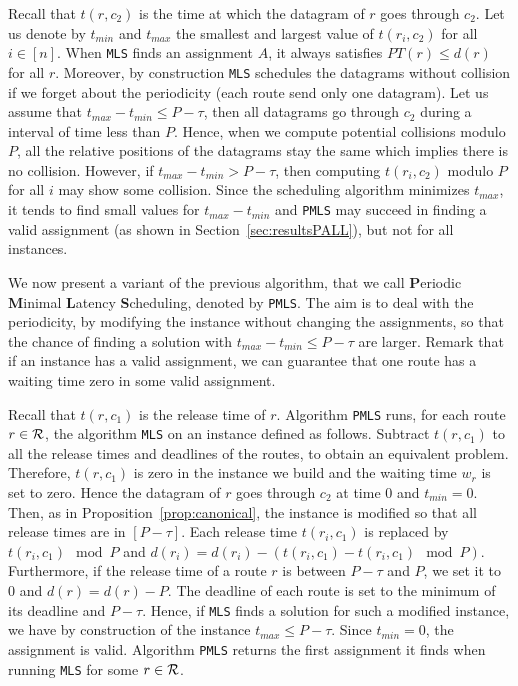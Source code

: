 \documentclass[a4paper,10pt]{journal}
\newcommand\MLS{\texttt{MLS}\xspace}
\newcommand\PMLS{\texttt{PMLS}\xspace}
\begin{document}
    
     Recall that $t(r,c_2)$ is the time at which the datagram of $r$ goes through $c_2$. Let us denote by $t_{min}$ and $t_{max}$ the smallest and largest value of $t(r_i,c_2)$ for all $i \in[n]$. When \MLS finds an assignment $A$, it always satisfies $PT(r) \leq d(r)$ for all $r$. Moreover, by construction \MLS schedules the datagrams without collision if we forget about the periodicity (each route send only one datagram). Let us assume that $t_{max}- t_{min} \leq P -\tau $, then all datagrams go through $c_2$ during a interval of time less than $P$. Hence, when we compute potential collisions modulo $P$, all the relative positions of the datagrams stay the same which implies there is no collision. However, if $t_{max}- t_{min} > P -\tau $, then computing $t(r_i,c_2)$ modulo $P$ for all $i$ may show some collision. Since the scheduling algorithm minimizes $t_{max}$, it tends to find  small values for $t_{max} - t_{min}$ and \PMLS may succeed in finding a valid assignment (as shown in Section~\ref{sec:resultsPALL}), but not for all instances. 
     
     We now present a variant of the previous algorithm, that we call
     \textbf{P}eriodic \textbf{M}inimal \textbf{L}atency \textbf{S}cheduling, denoted by \PMLS. The aim is to deal with the periodicity, by modifying the instance without changing the assignments, so that the chance of finding a solution with $t_{max}- t_{min} \leq P -\tau $ are larger.  Remark that if an instance has a valid assignment, we can guarantee that one route has a waiting time zero in some valid assignment. 
     
      Recall that $t(r,c_1)$ is the release time of $r$. Algorithm \PMLS runs, for each route $r \in \cal{R}$, the algorithm \MLS on an instance defined as follows. Subtract $t(r,c_1)$ to all the release times and deadlines of the routes, to obtain an equivalent problem. Therefore, $t(r,c_1)$ is zero in the instance we build and the waiting time $w_r$ is set to zero. Hence the datagram of $r$ goes through $c_2$ at time $0$ and $t_{min} = 0$.
     Then, as in Proposition~\ref{prop:canonical}, the instance is modified so that all release times are in $[P-\tau]$. Each release time $t(r_i,c_1)$ is replaced by $t(r_i,c_1) \mod P$ and $d(r_i) = d(r_i) - (t(r_i,c_1) - t(r_i,c_1) \mod P)$. Furthermore, if the release time of a route $r$ is between $P-\tau$ and $P$, we set it to $0$ and $d(r) = d(r) - P$.  The deadline of each route is set to the minimum of its deadline and $P - \tau$. Hence, if \MLS finds a solution for such a modified instance, we have by construction of the instance $t_{max} \leq P -\tau $. Since $t_{min} = 0$, the assignment is valid. Algorithm \PMLS
     returns the first assignment it finds when running \MLS for some $r \in \cal{R}$.
\end{document}
